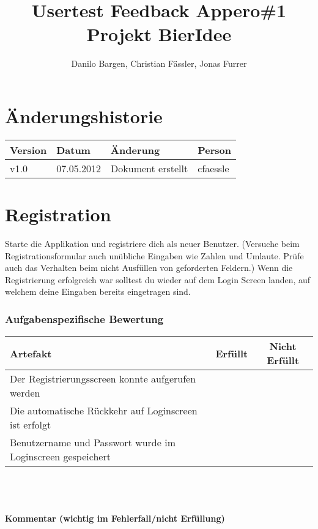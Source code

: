 \documentclass[10pt,a4paper]{scrartcl}
\author{Danilo Bargen, Christian Fässler, Jonas Furrer}
\title{Usertest Feedback Appero\#1\\ Projekt BierIdee}
\begin{document}
\begin{titlepage}
	\maketitle
	\vspace{120mm}
	\thispagestyle{empty} %
\end{titlepage}

\tableofcontents
\newpage

\section*{Änderungshistorie}
\begin{tabular}{p{}p{}p{}p{}}
\toprule
\textbf{Version} & \textbf{Datum} & \textbf{Änderung} & \textbf{Person} \\  
\midrule
v1.0 & 07.05.2012 & Dokument erstellt & cfaessle \\  
\hline 
\bottomrule
\end{tabular} 
\newpage

\section{Registration}
Starte die Applikation und registriere dich als neuer Benutzer. 
(Versuche beim Registrationsformular auch unübliche Eingaben wie Zahlen und Umlaute. Prüfe auch das Verhalten beim nicht Ausfüllen von geforderten Feldern.)
Wenn die Registrierung erfolgreich war solltest du wieder auf dem Login Screen landen, auf welchem deine Eingaben bereits eingetragen sind.

\subsubsection*{Aufgabenspezifische Bewertung}
\begin{tabular}{|l|c|c|}
\hline 
\textbf{Artefakt} & \textbf{Erfüllt} & \textbf{Nicht Erfüllt} \\ 
\hline 
Der Registrierungsscreen konnte aufgerufen werden &  &  \\ 
\hline 
Die automatische Rückkehr auf Loginscreen ist erfolgt &  &  \\ 
\hline 
Benutzername und Passwort wurde im Loginscreen gespeichert &  &  \\ 
\hline 
\end{tabular}
\\
\\
\\
\textbf{Kommentar (wichtig im Fehlerfall/nicht Erfüllung)}
\vspace*{8cm}
\end{document}
